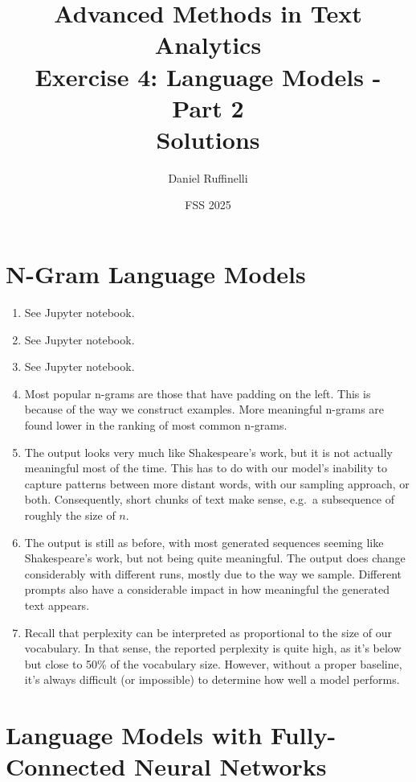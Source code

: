 \documentclass[11pt,a4paper]{article}
\title{Advanced Methods in Text Analytics \\ 
Exercise 4: Language Models - Part 2 \\
\textbf{Solutions}}
\author{Daniel Ruffinelli}
\date{FSS 2025}
\begin{document}
\maketitle

\section{N-Gram Language Models}

\begin{enumerate}[label=(\alph*)]
    \item See Jupyter notebook.
    \item See Jupyter notebook.
    \item See Jupyter notebook.
    \item Most popular n-grams are those that have padding on the left.
          This is because of the way we construct examples.
          More meaningful n-grams are found lower in the ranking of most common
          n-grams.
    \item The output looks very much like Shakespeare's work, but it is not
          actually meaningful most of the time.
          This has to do with our model's inability to capture patterns
          between more distant words, with our sampling approach, or both.
          Consequently, short chunks of text make sense, e.g.\ a subsequence of
          roughly the size of $n$.
    \item The output is still as before, with most generated sequences seeming
          like Shakespeare's work, but not being quite meaningful.
          The output does change considerably with different runs, mostly due to
          the way we sample.
          Different prompts also have a considerable impact in how meaningful
          the generated text appears.
    \item Recall that perplexity can be interpreted as proportional to the size
          of our vocabulary.
          In that sense, the reported perplexity is quite high, as it's below
          but close to 50\% of the vocabulary size.
          However, without a proper baseline, it's always difficult (or
          impossible) to determine how well a model performs.
\end{enumerate}

\section{Language Models with Fully-Connected Neural Networks}
\end{document}
